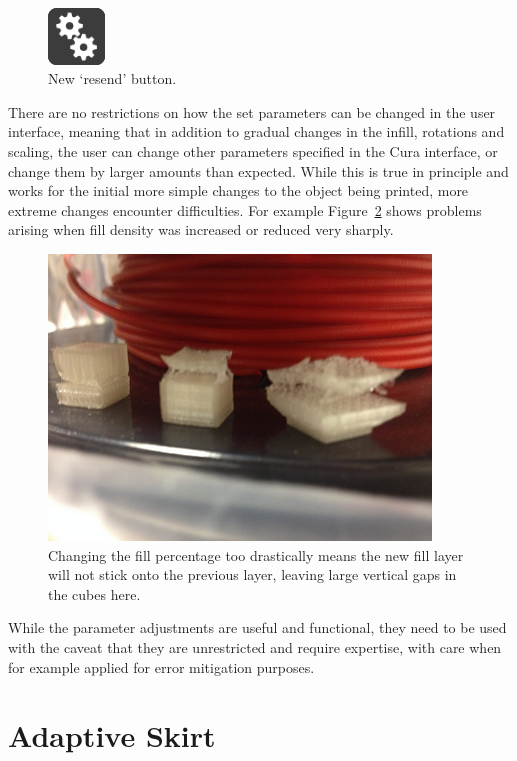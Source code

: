 \documentclass[pdftex, 11pt]{report} %
\begin{document}
\begin{figure}[H]
  \centering
  \includegraphics[width=1.5cm]{NewButton.png}
  \caption{New `resend' button.}
  \label{figure:NewButton}
\end{figure}

There are no restrictions on how the set parameters can be changed in the user interface, meaning that in addition to gradual changes in the infill, rotations and scaling, the user can change other parameters specified in the Cura interface, or change them by larger amounts than expected. While this is true in principle and works for the initial more simple changes to the object being printed, more extreme changes encounter difficulties. For example Figure~\ref{figure:MissingLayers} shows problems arising when fill density was increased or reduced very sharply.

\begin{figure}[H]
  \centering
  \includegraphics[width=4in]{MissingLayers.png}
  \caption{Changing the fill percentage too drastically means the new fill layer will not stick onto the previous layer, leaving large vertical gaps in the cubes here.}
  \label{figure:MissingLayers}
\end{figure}

While the parameter adjustments are useful and functional, they need to be used with the caveat that they are unrestricted and require expertise, with care when for example applied for error mitigation purposes.






\section{Adaptive Skirt}
\label{section:AdaptiveSkirt}
\end{document}
